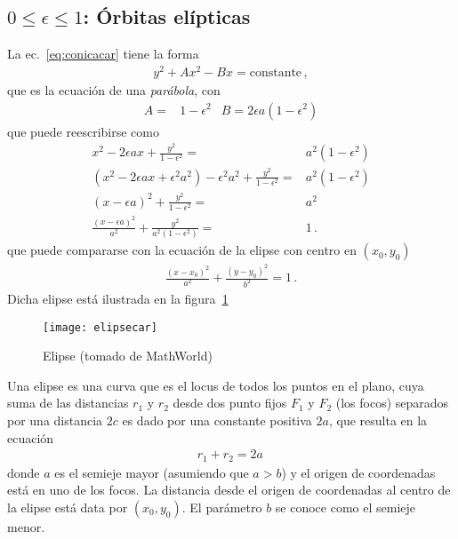 \subsection{$0\le \epsilon\le 1$: Órbitas elípticas}
\begin{frame}
La ec.~\eqref{eq:conicacar} tiene la forma
\begin{align}
    y^2+A x^2-Bx=\text{constante}\,,
  \end{align}
que es la ecuación de una \emph{parábola}, con
\begin{align}
  A=&1-\epsilon^2& B=2\epsilon a(1-\epsilon^2)
\end{align}
que puede reescribirse como
\begin{align}
  \label{eq:eli1}
x^2-2\epsilon ax + \frac{y^2}{1-\epsilon^2}=&a^2(1-\epsilon^2)\nonumber\\
(x^2-2\epsilon ax+\epsilon^2a^2)-\epsilon^2a^2 + \frac{y^2}{1-\epsilon^2}=&a^2(1-\epsilon^2)\nonumber\\
(x-\epsilon a)^2+ \frac{y^2}{1-\epsilon^2}=&a^2\nonumber\\
\frac{(x-\epsilon a)^2}{a^2}+\frac{y^2}{a^2(1-\epsilon^2)}=&1\,.
\end{align}
que puede compararse con la ecuación de la elipse con centro en $(x_0,y_0)$
\begin{align}
  \label{eq:hip2}
\frac{(x-x_0)^2}{a^2}+\frac{(y-y_0)^2}{b^2}=1\,.
\end{align}
Dicha elipse está ilustrada en la figura~\ref{fig:elipsecar}
\end{frame}
\begin{frame}
  

\begin{figure}
  \centering
  \texttt{[image: elipsecar]}
  \caption{Elipse (tomado de MathWorld)}
  \label{fig:elipsecar}
\end{figure}
\end{frame}
Una elipse es una curva que es el locus de todos los puntos en el plano, cuya suma de las distancias $r_1$ y $r_2$ desde dos punto fijos $F_1$ y $F_2$ (los focos) separados por una distancia $2c$ es dado por una constante positiva $2a$, que resulta en la ecuación
\begin{align}
  r_1+r_2=2a\,
\end{align}
donde $a$ es el semieje mayor (asumiendo que $a>b$) y el origen de coordenadas está en uno de los focos. La distancia desde el origen de coordenadas al centro de la elipse está data por $(x_0,y_0)$. El parámetro $b$ se conoce como el semieje menor.  


